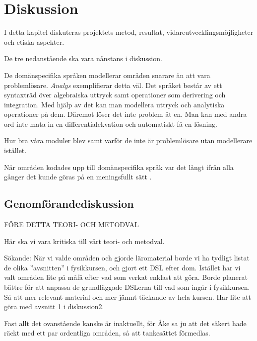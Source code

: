 
\chapter{Diskussion}

\begin{draft}

I detta kapitel diskuteras projektets metod, resultat,
vidareutvecklingsmöjligheter och etiska aspekter.

\end{draft}

\begin{binge}

De tre nedanstående ska vara nånstans i diskussion.

De domänspecifika språken modellerar områden snarare än att vara problemlösare.
\textit{Analys} exemplifierar detta väl. Det språket består av ett syntaxträd
över algebraiska uttryck samt operationer som derivering och integration. Med
hjälp av det kan man modellera uttryck och analytiska operationer på dem.
Däremot löser det inte problem åt en. Man kan med andra ord inte mata in en
differentialekvation och automatiskt få en lösning.

Hur bra våra moduler blev samt varför de inte är problemlösare utan modellerare
istället.

När områden kodades upp till domänspecifika språk var det långt ifrån alla gånger
det kunde göras på en meningsfullt sätt .

\section{Genomförandediskussion}

FÖRE DETTA TEORI- OCH METODVAL

Här ska vi vara kritiska till vårt teori- och metodval.

Sökande: När vi valde områden och gjorde läromaterial borde vi ha tydligt listat
de olika ''avsnitten'' i fysikkursen, och gjort ett DSL efter dom. Istället har
vi valt områden lite på måfå efter vad som verkat enklast att göra. Borde
planerat bättre för att anpassa de grundläggade DSLerna till vad som ingår i
fysikkursen. Så att mer relevant material och mer jämnt täckande av hela kursen.
Har lite att göra med avsnitt 1 i diskussion2.

Fast allt det ovanstående kanske är inaktuellt, för Åke sa ju att det säkert
hade räckt med ett par ordentliga områden, så att tankesättet förmedlas.


\end{binge}
